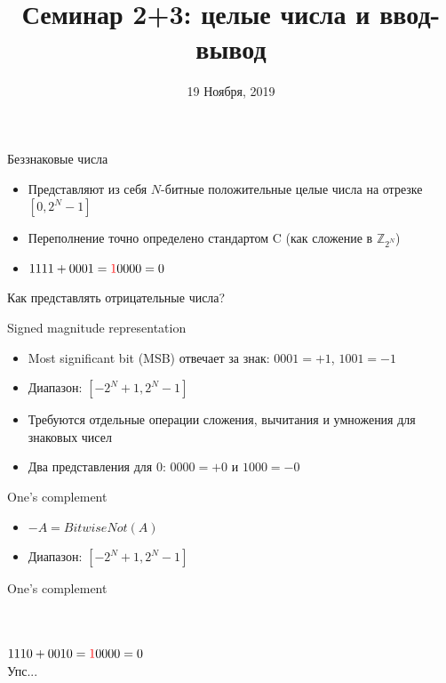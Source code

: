 \documentclass[10pt,pdf,hyperref={unicode}]{beamer}
\title{Семинар 2+3: целые числа и ввод-вывод}
\date{19 Ноября, 2019}
\begin{document}
\begin{frame}
  \titlepage
\end{frame}

\begin{frame}{Беззнаковые числа}
    \begin{itemize}
        \item Представляют из себя $N$-битные положительные целые числа на отрезке $[0, 2^N - 1]$
        \item Переполнение точно определено стандартом C (как сложение в $\mathbb{Z}_{2^N}$)
        \item $1111 + 0001 = \textcolor{red}{1}0000 = 0$
    \end{itemize}
\end{frame}

\begin{frame}
    \begin{center}
        \large{Как представлять отрицательные числа?}
    \end{center}
\end{frame}

\begin{frame}{Signed magnitude representation}
    \begin{itemize}
        \item Most significant bit (MSB) отвечает за знак: $0001 = +1$, $1001 = -1$
        \item Диапазон: $[-2^N+1, 2^N-1]$
        \item Требуются отдельные операции сложения, вычитания и умножения для знаковых чисел
        \item Два представления для 0: $0000 = +0$ и $1000 = -0$
    \end{itemize}
\end{frame}

\begin{frame}{One's complement}
    \begin{itemize}
        \item $-A = BitwiseNot(A)$
        \item Диапазон: $[-2^N+1, 2^N-1]$
    \end{itemize}
\end{frame}

\begin{frame}{One's complement}
    \begin{center}
         \\
         \\
        $1110 + 0010 = \textcolor{red}10000 = 0$ \\
        Упс...
    \end{center}
\end{frame}
\end{document}
